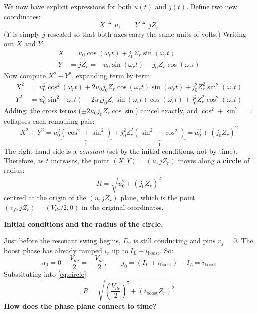 \documentclass[12pt, a4paper]{article}
\def\,{ }%
\newcommand{\Vdc}{V_{dc}}
\newcommand{\vf}{v_f}
\newcommand{\ir}{i_r}
\newcommand{\IL}{I_L}
\newcommand{\omegar}{\omega_r}
\newcommand{\Zr}{Z_r}
\begin{document}
\begin{eqnbox}
\medskip
We now have explicit expressions for both $u(t)$ and $j(t)$.
Define two new coordinates:
\begin{equation*}
    X \triangleq u, \qquad Y \triangleq j\,\Zr
\end{equation*}
($Y$ is simply $j$ rescaled so that both axes carry the same units of
volts.)  Writing out $X$ and $Y$:
\begin{align*}
    X &= u_0\cos(\omegar t) + j_0\Zr\,\sin(\omegar t) \\[4pt]
    Y &= j\Zr = -u_0\sin(\omegar t) + j_0\Zr\,\cos(\omegar t)
\end{align*}
Now compute $X^2 + Y^2$, expanding term by term:
\begin{align*}
    X^2 &= u_0^2\cos^2(\omegar t)
           + 2u_0 j_0\Zr\cos(\omegar t)\sin(\omegar t)
           + j_0^2\Zr^2\sin^2(\omegar t) \\[4pt]
    Y^2 &= u_0^2\sin^2(\omegar t)
           - 2u_0 j_0\Zr\sin(\omegar t)\cos(\omegar t)
           + j_0^2\Zr^2\cos^2(\omegar t)
\end{align*}
Adding: the cross terms ($\pm 2u_0 j_0\Zr\cos\sin$) cancel exactly, and
$\cos^2 + \sin^2 = 1$ collapses each remaining pair:
\begin{equation}
    X^2 + Y^2
        = u_0^2\underbrace{(\cos^2 + \sin^2)}_{1}
        + j_0^2\Zr^2\underbrace{(\sin^2 + \cos^2)}_{1}
        = u_0^2 + (j_0\Zr)^2
    \label{eq:circle}
\end{equation}
The right-hand side is a \emph{constant} (set by the initial conditions,
not by time).  Therefore, as $t$ increases, the point $(X, Y) = (u,\,j\Zr)$
moves along a \textbf{circle} of radius:
\begin{equation*}
    R = \sqrt{u_0^2 + (j_0\Zr)^2}
\end{equation*}
centred at the origin of the $(u,\,j\Zr)$ plane, which is the point
$(\vf,\,j\Zr) = (\Vdc/2,\,0)$ in the original coordinates.

\medskip
\textbf{Initial conditions and the radius of the circle.}

Just before the resonant swing begins, $D_2$ is still conducting and
pins $\vf = 0$.  The boost phase has already ramped $\ir$ up to
$\IL + i_\text{boost}$.  So:
\begin{equation}
    u_0 = 0 - \frac{\Vdc}{2} = -\frac{\Vdc}{2},
    \qquad
    j_0 = (\IL + i_\text{boost}) - \IL = i_\text{boost}
    \label{eq:swing_ic}
\end{equation}
Substituting into \eqref{eq:circle}:
\begin{equation}
    R = \sqrt{\left(\frac{\Vdc}{2}\right)^{\!2} + (i_\text{boost}\,\Zr)^2}
    \label{eq:radius}
\end{equation}
\textbf{How does the phase plane connect to time?}


\end{eqnbox}
\end{document}
